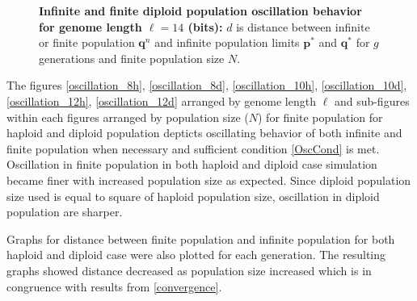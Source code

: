 \begin{figure}[H]
\begin{center}
{}


\caption{\textbf{Infinite and finite diploid population oscillation behavior for genome length $\ell = 14$ (bits):} $d$ is
  distance between infinite or finite population ${\bm q}^n$ and infinite
  population limits ${{\bm p}^\ast}$ and ${{\bm q}^{\ast}}$ for $g$ generations and finite population size $N$.}
\label{oscillation_14d}
\end{center}
\end{figure}


The figures \ref{oscillation_8h}, \ref{oscillation_8d}, \ref{oscillation_10h}, \ref{oscillation_10d}, \ref{oscillation_12h}, \ref{oscillation_12d} arranged by genome length $\ell$ and 
sub-figures within each figures arranged by population size ($N$) for finite population for haploid and diploid population 
depticts oscillating behavior of both infinite and finite population when necessary and sufficient condition \ref{OscCond} is met. 
Oscillation in finite population in both haploid and diploid case simulation became finer with increased population size as expected. 
Since diploid population size used is equal to square of haploid population size, oscillation in diploid population are sharper.

Graphs for distance between finite population and infinite population for both haploid and diploid case were also plotted for each generation. 
The resulting graphs showed distance decreased as population size increased which is in congruence with results from \ref{convergence}.  

